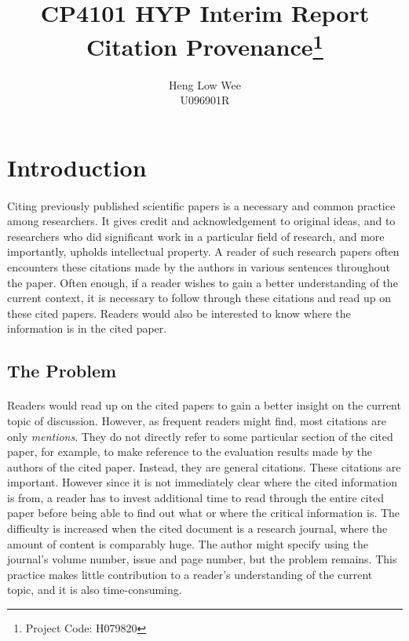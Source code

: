 \documentclass[12 pt]{article}
\begin{document}

\title{CP4101 HYP Interim Report \\ Citation Provenance\footnote{Project Code: H079820}}
\author{Heng Low Wee \\ U096901R}
\maketitle

\doublespacing
\section{Introduction}
\paragraph{}
Citing previously published scientific papers is a necessary and common practice among researchers. It gives credit and acknowledgement to original ideas, and to researchers who did significant work in a particular field of research, and more importantly, upholds intellectual property. A reader of such research papers often encounters these citations made by the authors in various sentences throughout the paper. Often enough, if a reader wishes to gain a better understanding of the current context, it is necessary to follow through these citations and read up on these cited papers. Readers would also be interested to know where the information is in the cited paper.

\subsection{The Problem}
\paragraph{}
Readers would read up on the cited papers to gain a better insight on the current topic of discussion. However, as frequent readers might find, most citations are only \textit{mentions}. They do not directly refer to some particular section of the cited paper, for example, to make reference to the evaluation results made by the authors of the cited paper. Instead, they are general citations. These citations are important. However since it is not immediately clear where the cited information is from, a reader has to invest additional time to read through the entire cited paper before being able to find out what or where the critical information is. The difficulty is increased when the cited document is a research journal, where the amount of content is comparably huge. The author might specify using the journal's volume number, issue and page number, but the problem remains. This practice makes little contribution to a reader's understanding of the current topic, and it is also time-consuming.
\end{document}
